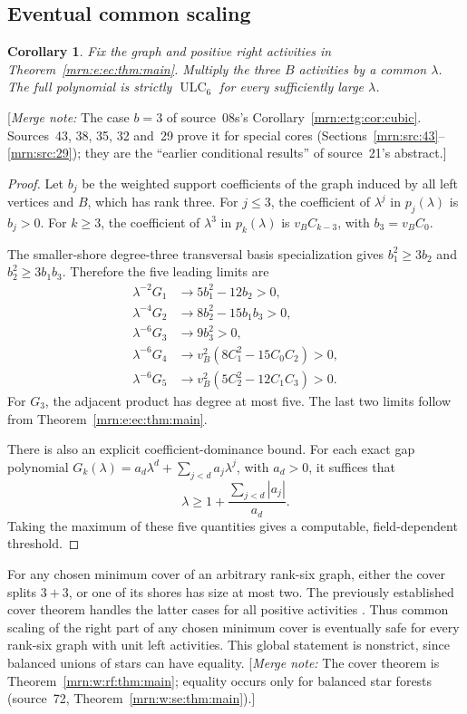 \documentclass[11pt,a4paper]{article}
\newtheorem{corollary}[theorem]{Corollary}
\theoremstyle{remark}\newtheorem{remark}[theorem]{Remark}
\newcommand{\ULC}{\operatorname{ULC}}      %
\newcommand{\mnote}[1]{[\textit{Merge note:} #1]}
\begin{document}
\subsection{Eventual common scaling}
\begin{corollary}\label{mrn:e:ec:cor:scaling}
Fix the graph and positive right activities in Theorem~\ref{mrn:e:ec:thm:main}. Multiply the three $B$ activities by a common $\lambda$. The full polynomial is strictly $\ULC_6$ for every sufficiently large $\lambda$.
\end{corollary}
\mnote{The case $b=3$ of source~08s's Corollary~\ref{mrn:e:tg:cor:cubic}. Sources~43, 38, 35, 32 and~29 prove it for special cores (Sections~\ref{mrn:src:43}--\ref{mrn:src:29}); they are the ``earlier conditional results'' of source~21's abstract.}
\begin{proof}
Let $b_j$ be the weighted support coefficients of the graph induced by all left vertices and $B$, which has rank three. For $j\le3$, the coefficient of $\lambda^j$ in $p_j(\lambda)$ is $b_j>0$. For $k\ge3$, the coefficient of $\lambda^3$ in $p_k(\lambda)$ is $v_BC_{k-3}$, with $b_3=v_BC_0$.

The smaller-shore degree-three transversal basis specialization gives
$b_1^2\ge3b_2$ and $b_2^2\ge3b_1b_3$. Therefore the five leading limits are
\begin{align*}
 \lambda^{-2}G_1&\longrightarrow5b_1^2-12b_2>0,\\
 \lambda^{-4}G_2&\longrightarrow8b_2^2-15b_1b_3>0,\\
 \lambda^{-6}G_3&\longrightarrow9b_3^2>0,\\
 \lambda^{-6}G_4&\longrightarrow v_B^2(8C_1^2-15C_0C_2)>0,\\
 \lambda^{-6}G_5&\longrightarrow v_B^2(5C_2^2-12C_1C_3)>0.
\end{align*}
For $G_3$, the adjacent product has degree at most five. The last two limits follow from Theorem~\ref{mrn:e:ec:thm:main}.

There is also an explicit coefficient-dominance bound. For each exact gap polynomial
$G_k(\lambda)=a_d\lambda^d+\sum_{j<d}a_j\lambda^j$, with $a_d>0$, it suffices that
\[
 \lambda\ge1+\frac{\sum_{j<d}|a_j|}{a_d}.
\]
Taking the maximum of these five quantities gives a computable, field-dependent threshold.
\end{proof}

For any chosen minimum cover of an arbitrary rank-six graph, either the cover splits $3+3$, or one of its shores has size at most two. The previously established cover theorem handles the latter cases for all positive activities \cite{b:m74}. Thus common scaling of the right part of any chosen minimum cover is eventually safe for every rank-six graph with unit left activities. This global statement is nonstrict, since balanced unions of stars can have equality. \mnote{The cover theorem is Theorem~\ref{mrn:w:rf:thm:main}; equality occurs only for balanced star forests (source~72, Theorem~\ref{mrn:w:se:thm:main}).}
\end{document}
